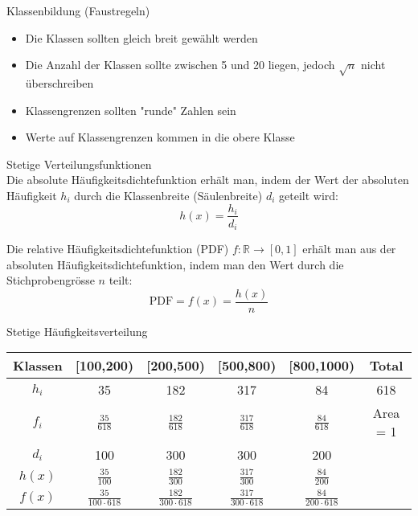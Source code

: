 \begin{concept}{Klassenbildung (Faustregeln)}\\
\begin{itemize}
  \item Die Klassen sollten gleich breit gewählt werden
  \item Die Anzahl der Klassen sollte zwischen 5 und 20 liegen, jedoch $\sqrt{n}$ nicht überschreiben
  \item Klassengrenzen sollten "runde" Zahlen sein
  \item Werte auf Klassengrenzen kommen in die obere Klasse
\end{itemize}
\end{concept}

\begin{definition}{Stetige Verteilungsfunktionen}\\
Die absolute Häufigkeitsdichtefunktion erhält man, indem der Wert der absoluten Häufigkeit $h_i$ durch die Klassenbreite (Säulenbreite) $d_i$ geteilt wird:
$$h(x) = \frac{h_i}{d_i}$$

Die relative Häufigkeitsdichtefunktion (PDF) $f: \mathbb{R} \rightarrow [0,1]$ erhält man aus der absoluten Häufigkeitsdichtefunktion, indem man den Wert durch die Stichprobengrösse $n$ teilt:
$$\text{PDF} = f(x) = \frac{h(x)}{n}$$

\begin{example}{Stetige Häufigkeitsverteilung}\\
\renewcommand{\arraystretch}{2}%
\begin{center}
\begin{tabular}{|c|c|c|c|c|c|}
\hline
Klassen & [100,200) & [200,500) & [500,800) & [800,1000) & Total \\
\hline
$h_i$ & 35 & 182 & 317 & 84 & 618 \\
\hline
$f_i$ & $\frac{35}{618}$ & $\frac{182}{618}$ & $\frac{317}{618}$ & $\frac{84}{618}$ & Area = 1 \\
\hline
$d_i$ & 100 & 300 & 300 & 200 & \\
\hline
$h(x)$ & $\frac{35}{100}$ & $\frac{182}{300}$ & $\frac{317}{300}$ & $\frac{84}{200}$ & \\
\hline
$f(x)$ & $\frac{35}{100 \cdot 618}$ & $\frac{182}{300 \cdot 618}$ & $\frac{317}{300 \cdot 618}$ & $\frac{84}{200 \cdot 618}$ & \\
\hline
\end{tabular}
\end{center}
\end{example}
\end{definition}

